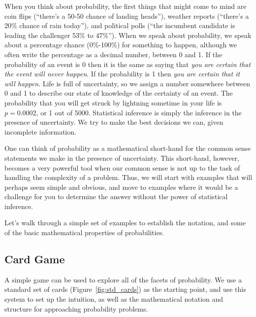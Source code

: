When you think about probability, the first things that might come to mind are coin flips (``there's a 50-50 chance of landing heads''), weather reports (``there's a 20\% chance of rain today''), and political polls (``the incumbent candidate is leading the challenger 53\% to 47\%'').  When we speak about probability, we speak about a percentage chance (0\%-100\%) for something to happen, although we often write the percentage as a decimal number, between 0 and 1.  If the  probability of an event is 0 then it is the same as saying that {\em you are certain that the event will never happen}.  If the probability is 1 then {\em you are certain that it {\em will} happen}.  Life is full of uncertainty, so we assign a number somewhere between 0 and 1 to describe our state of knowledge of the certainty of an event. The probability that you will get struck by lightning sometime in your life is $p=0.0002$, or 1 out of 5000. Statistical inference is simply the inference in the presence of uncertainty.  We try to make the best decisions we can, given incomplete information.  


One can think of probability as a mathematical short-hand for the common sense statements we make in the presence of uncertainty.  This short-hand, however, becomes a very powerful tool when our common sense is not up to the task of handling the complexity of a problem.  Thus, we will start with examples that will perhaps seem simple and obvious, and move to examples where it would be a challenge for you to determine the answer without the power of statistical inference.

Let's walk through a simple set of examples to establish the notation, and some of the basic mathematical properties of probabilities.

\subsection{Card Game}

A simple game can be used to explore all of the facets of probability.  We use a standard set of cards (Figure~\ref{fig:std_cards}) as the starting point, and use this system to set up the intuition, as well as the mathematical notation and structure for approaching probability problems.  

